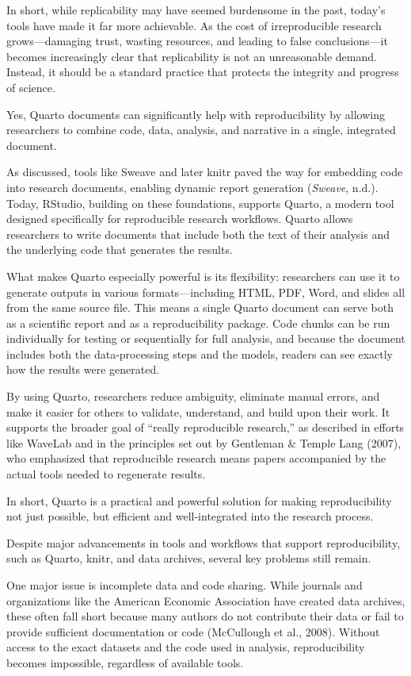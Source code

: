 \documentclass[
  a4paper,
]{article}
\begin{document}
In short, while replicability may have seemed burdensome in the past,
today's tools have made it far more achievable. As the cost of
irreproducible research grows---damaging trust, wasting resources, and
leading to false conclusions---it becomes increasingly clear that
replicability is not an unreasonable demand. Instead, it should be a
standard practice that protects the integrity and progress of science.

Yes, Quarto documents can significantly help with reproducibility by
allowing researchers to combine code, data, analysis, and narrative in a
single, integrated document.

As discussed, tools like Sweave and later knitr paved the way for
embedding code into research documents, enabling dynamic report
generation (\emph{Sweave}, n.d.). Today, RStudio, building on these
foundations, supports Quarto, a modern tool designed specifically for
reproducible research workflows. Quarto allows researchers to write
documents that include both the text of their analysis and the
underlying code that generates the results.

What makes Quarto especially powerful is its flexibility: researchers
can use it to generate outputs in various formats---including HTML, PDF,
Word, and slides all from the same source file. This means a single
Quarto document can serve both as a scientific report and as a
reproducibility package. Code chunks can be run individually for testing
or sequentially for full analysis, and because the document includes
both the data-processing steps and the models, readers can see exactly
how the results were generated.

By using Quarto, researchers reduce ambiguity, eliminate manual errors,
and make it easier for others to validate, understand, and build upon
their work. It supports the broader goal of ``really reproducible
research,'' as described in efforts like WaveLab and in the principles
set out by Gentleman \& Temple Lang (2007), who emphasized that
reproducible research means papers accompanied by the actual tools
needed to regenerate results.

In short, Quarto is a practical and powerful solution for making
reproducibility not just possible, but efficient and well-integrated
into the research process.

Despite major advancements in tools and workflows that support
reproducibility, such as Quarto, knitr, and data archives, several key
problems still remain.

One major issue is incomplete data and code sharing. While journals and
organizations like the American Economic Association have created data
archives, these often fall short because many authors do not contribute
their data or fail to provide sufficient documentation or code
(McCullough et al., 2008). Without access to the exact datasets and the
code used in analysis, reproducibility becomes impossible, regardless of
available tools.
\end{document}
